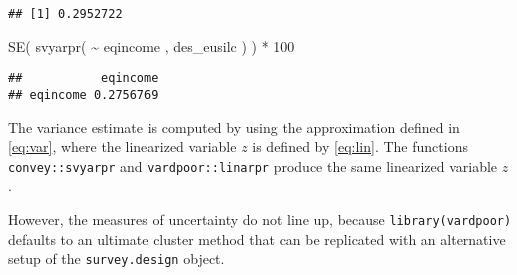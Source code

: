 \documentclass[
]{book}
\newenvironment{Shaded}{\begin{snugshade}}{\end{snugshade}}
\newcommand{\DecValTok}[1]{\textcolor[rgb]{0.00,0.00,0.81}{#1}}
\newcommand{\FunctionTok}[1]{\textcolor[rgb]{0.00,0.00,0.00}{#1}}
\newcommand{\NormalTok}[1]{#1}
\newcommand{\SpecialCharTok}[1]{\textcolor[rgb]{0.00,0.00,0.00}{#1}}
\begin{document}
\begin{verbatim}
## [1] 0.2952722
\end{verbatim}

\begin{Shaded}
\begin{Highlighting}[]
\FunctionTok{SE}\NormalTok{( }\FunctionTok{svyarpr}\NormalTok{( }\SpecialCharTok{\textasciitilde{}}\NormalTok{ eqincome , des\_eusilc ) ) }\SpecialCharTok{*} \DecValTok{100}
\end{Highlighting}
\end{Shaded}

\begin{verbatim}
##           eqincome
## eqincome 0.2756769
\end{verbatim}

The variance estimate is computed by using the approximation defined in \eqref{eq:var}, where the linearized variable \(z\) is defined by \eqref{eq:lin}. The functions \texttt{convey::svyarpr} and \texttt{vardpoor::linarpr} produce the same linearized variable \(z\).

However, the measures of uncertainty do not line up, because \texttt{library(vardpoor)} defaults to an ultimate cluster method that can be replicated with an alternative setup of the \texttt{survey.design} object.
\end{document}
